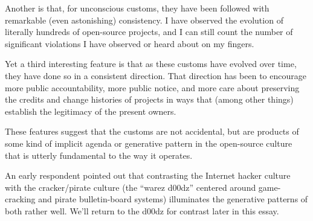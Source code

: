 Another is that, for unconscious customs, they have been followed with
remarkable (even astonishing) consistency.  I have observed the evolution of
literally hundreds of open-source projects, and I can still count the number of
significant violations I have observed or heard about on my fingers.

Yet a third interesting feature is that as these customs have evolved over time,
they have done so in a consistent direction.  That direction has been to
encourage more public accountability, more public notice, and more care about
preserving the credits and change histories of projects in ways that (among
other things) establish the legitimacy of the present owners.

These features suggest that the customs are not accidental, but are products of
some kind of implicit agenda or generative pattern in the open-source culture
that is utterly fundamental to the way it operates.

An early respondent pointed out that contrasting the Internet hacker culture
with the cracker/pirate culture (the ``warez d00dz'' centered around
game-cracking and pirate bulletin-board systems) illuminates the generative
patterns of both rather well.  We'll return to the d00dz for contrast later in
this essay.
